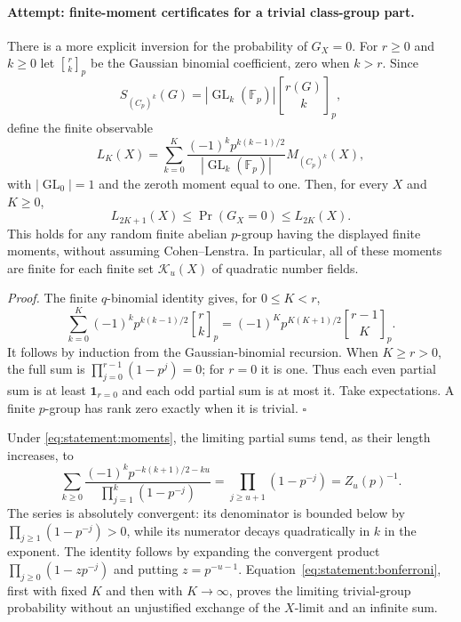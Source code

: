 \documentclass[11pt,a4paper]{article}
\newcommand{\F}{\mathbb{F}}
\numberwithin{equation}{section}
\begin{document}
\paragraph{Attempt: finite-moment certificates for a trivial class-group part.}
There is a more explicit inversion for the probability of $G_X=0$.
For $r\geq0$ and $k\geq0$ let $\genfrac{[}{]}{0pt}{}{r}{k}_p$ be the Gaussian binomial
coefficient, zero when $k>r$. Since
\[
 S_{(C_p)^k}(G)=|\operatorname{GL}_k(\F_p)|\genfrac{[}{]}{0pt}{}{r(G)}{k}_p,
\]
define the finite observable
\[
 L_K(X)=\sum_{k=0}^K
 \frac{(-1)^k p^{k(k-1)/2}}{|\operatorname{GL}_k(\F_p)|}
 M_{(C_p)^k}(X),
\]
with $|\operatorname{GL}_0|=1$ and the zeroth moment equal to one.
Then, for every $X$ and $K\geq0$,
\begin{equation}\label{eq:statement:bonferroni}
 L_{2K+1}(X)\leq\Pr(G_X=0)\leq L_{2K}(X).
\end{equation}
This holds for any random finite abelian $p$-group having the displayed
finite moments, without assuming Cohen--Lenstra. In particular, all of
these moments are finite for each finite set $\mathcal K_u(X)$ of quadratic number fields.

\emph{Proof.} The finite $q$-binomial identity gives, for $0\leq K<r$,
\[
 \sum_{k=0}^K(-1)^kp^{k(k-1)/2}\genfrac{[}{]}{0pt}{}{r}{k}_p
 =(-1)^Kp^{K(K+1)/2}\genfrac{[}{]}{0pt}{}{r-1}{K}_p.
\]
It follows by induction from the Gaussian-binomial recursion. When
$K\geq r>0$, the full sum is
$\prod_{j=0}^{r-1}(1-p^j)=0$; for $r=0$ it is one.
Thus each even partial sum is at least $\mathbf1_{r=0}$ and each odd
partial sum is at most it. Take expectations. A finite $p$-group has
rank zero exactly when it is trivial. $\square$

Under \eqref{eq:statement:moments}, the limiting partial sums tend, as their
length increases, to
\begin{equation}\label{eq:statement:euler}
 \sum_{k\geq0}
 \frac{(-1)^k p^{-k(k+1)/2-ku}}{\prod_{j=1}^k(1-p^{-j})}
 =\prod_{j\geq u+1}(1-p^{-j})=Z_u(p)^{-1}.
\end{equation}
The series is absolutely convergent: its denominator is bounded below by
$\prod_{j\geq1}(1-p^{-j})>0$, while its numerator decays quadratically in
$k$ in the exponent. The identity follows by expanding the convergent
product $\prod_{j\geq0}(1-zp^{-j})$ and putting $z=p^{-u-1}$.
Equation~\eqref{eq:statement:bonferroni}, first with fixed $K$ and then with
$K\to\infty$, proves the limiting trivial-group probability without an
unjustified exchange of the $X$-limit and an infinite sum.
\end{document}
